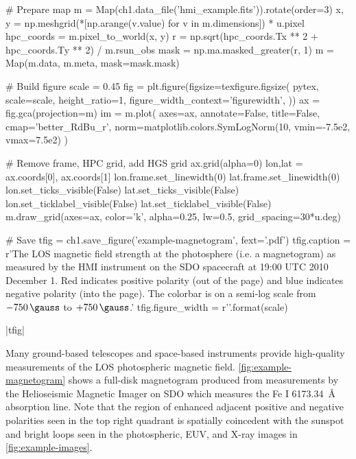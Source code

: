 \begin{pycode}[chapter1]
# Prepare map
m = Map(ch1.data_file('hmi_example.fits')).rotate(order=3)
x, y = np.meshgrid(*[np.arange(v.value) for v in m.dimensions]) * u.pixel
hpc_coords = m.pixel_to_world(x, y)
r = np.sqrt(hpc_coords.Tx ** 2 + hpc_coords.Ty ** 2) / m.rsun_obs
mask = np.ma.masked_greater(r, 1)
m = Map(m.data, m.meta, mask=mask.mask)

# Build figure
scale = 0.45
fig = plt.figure(figsize=texfigure.figsize(
    pytex,
    scale=scale,
    height_ratio=1,
    figure_width_context='figurewidth',
))
ax = fig.gca(projection=m)
im = m.plot(
    axes=ax,
    annotate=False,
    title=False,
    cmap='better_RdBu_r',
    norm=matplotlib.colors.SymLogNorm(10, vmin=-7.5e2, vmax=7.5e2)
)

# Remove frame, HPC grid, add HGS grid
ax.grid(alpha=0)
lon,lat = ax.coords[0], ax.coords[1]
lon.frame.set_linewidth(0)
lat.frame.set_linewidth(0)
lon.set_ticks_visible(False)
lat.set_ticks_visible(False)
lon.set_ticklabel_visible(False)
lat.set_ticklabel_visible(False)
m.draw_grid(axes=ax, color='k', alpha=0.25, lw=0.5, grid_spacing=30*u.deg)

# Save
tfig = ch1.save_figure('example-magnetogram', fext='.pdf')
tfig.caption = r'The LOS magnetic field strength at the photosphere (i.e. a magnetogram) as measured by the HMI instrument on the SDO spacecraft at 19:00 UTC 2010 December 1. Red indicates positive polarity (out of the page) and blue indicates negative polarity (into the page). The colorbar is on a semi-log scale from $-\SI{750}{\gauss}$ to $+\SI{750}{\gauss}$.'
tfig.figure_width = r'{}\textwidth'.format(scale)
\end{pycode}
\py[chapter1]|tfig|

Many ground-based telescopes \citep[e.g. GONG, Mt. Wilson][]{howard_mount_1976} and space-based instruments \citep[e.g. SOHO/MDI][]{scherrer_solar_1995} provide high-quality measurements of the LOS photospheric magnetic field. \autoref{fig:example-magnetogram} shows a full-disk magnetogram produced from measurements by the Helioseismic Magnetic Imager \citep[HMI,][]{hoeksema_helioseismic_2014} on SDO which measures the Fe I \SI{6173.34}{\angstrom} absorption line. Note that the region of enhanced adjacent positive and negative polarities seen in the top right quadrant is spatially coincedent with the sunspot and bright loops seen in the photospheric, EUV, and X-ray images in \autoref{fig:example-images}.

